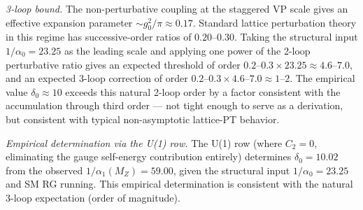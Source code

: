 \documentclass[
]{article}
\begin{document}
\begin{itemize}
  \emph{3-loop bound.} The non-perturbative coupling at the staggered VP
  scale gives an effective expansion parameter
  \(\sim g_0^2/\pi \approx 0.17\). Standard lattice perturbation theory
  in this regime has successive-order ratios of \(0.20\)--\(0.30\).
  Taking the structural input \(1/\alpha_0 = 23.25\) as the leading
  scale and applying one power of the 2-loop perturbative ratio gives an
  expected threshold of order
  \(0.2\)--\(0.3 \times 23.25 \approx 4.6\)--\(7.0\), and an expected
  3-loop correction of order
  \(0.2\)--\(0.3 \times 4.6\)--\(7.0 \approx 1\)--\(2\). The empirical
  value \(\delta_0 \approx 10\) exceeds this natural 2-loop order by a
  factor consistent with the accumulation through third order --- not
  tight enough to serve as a derivation, but consistent with typical
  non-asymptotic lattice-PT behavior.

  \emph{Empirical determination via the U(1) row.} The U(1) row (where
  \(C_2 = 0\), eliminating the gauge self-energy contribution entirely)
  determines \(\delta_0 = 10.02\) from the observed
  \(1/\alpha_1(M_Z) = 59.00\), given the structural input
  \(1/\alpha_0 = 23.25\) and SM RG running. This empirical determination
  is consistent with the natural 3-loop expectation (order of
  magnitude).


\end{itemize}
\end{document}
